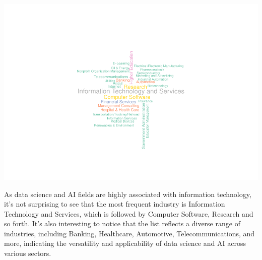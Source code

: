 \documentclass[11pt,]{article}
\newenvironment{Shaded}{\begin{snugshade}}{\end{snugshade}}
\newcommand{\AttributeTok}[1]{\textcolor[rgb]{0.13,0.29,0.53}{#1}}
\newcommand{\ConstantTok}[1]{\textcolor[rgb]{0.56,0.35,0.01}{#1}}
\newcommand{\DecValTok}[1]{\textcolor[rgb]{0.00,0.00,0.81}{#1}}
\newcommand{\FloatTok}[1]{\textcolor[rgb]{0.00,0.00,0.81}{#1}}
\newcommand{\FunctionTok}[1]{\textcolor[rgb]{0.13,0.29,0.53}{\textbf{#1}}}
\newcommand{\NormalTok}[1]{#1}
\newcommand{\OtherTok}[1]{\textcolor[rgb]{0.56,0.35,0.01}{#1}}
\newcommand{\SpecialCharTok}[1]{\textcolor[rgb]{0.81,0.36,0.00}{\textbf{#1}}}
\newcommand{\StringTok}[1]{\textcolor[rgb]{0.31,0.60,0.02}{#1}}
\begin{document}
\begin{Shaded}
\end{Shaded}

\includegraphics{figs/eda-industry-wordcloud.pdf}

As data science and AI fields are highly associated with information
technology, it's not surprising to see that the most frequent industry
is Information Technology and Services, which is followed by Computer
Software, Research and so forth. It's also interesting to notice that
the list reflects a diverse range of industries, including Banking,
Healthcare, Automotive, Telecommunications, and more, indicating the
versatility and applicability of data science and AI across various
sectors.
\end{document}
